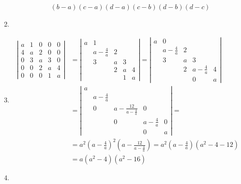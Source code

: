 \documentclass[twoside]{amsart}
\theoremstyle{plain}
\theoremstyle{definition}
\begin{document}
\begin{enumerate}
\[\begin{aligned}
    & \boxed{ (b-a)(c-a)(d-a)(c-b)(d-b) (d-c) }
  \end{aligned} \]
\item 
\item \[
  \begin{aligned}
\left| \begin{matrix} a & 1 & 0 & 0 & 0 \\ 4 & a & 2 & 0 & 0 \\ 0 & 3 & a & 3 & 0 \\ 0 & 0 & 2 & a & 4 \\ 0 & 0 & 0 & 1 & a \end{matrix} \right| & = \left| \begin{matrix} a & 1 & & & \\ & a-\frac{4}{a} & 2 & & \\ & 3 & a & 3 & \\ & & 2 & a & 4 \\ & & & 1 & a \end{matrix} \right| = \left|  \begin{matrix} a & 0 & & & \\ & a-\frac{4}{a} & 2 & & \\ & 3 & a & 3 & \\ & & 2 & a - \frac{4}{a} & 4 \\ & & & 0  & a \end{matrix} \right|  \\
& = \left|  \begin{matrix} a &  & & & \\ & a-\frac{4}{a} &  & & \\ & 0 & a-\frac{12}{a-\frac{4}{a}} & 0 & \\ & & 0 & a-\frac{4}{a} & 0 \\ & & & 0 & a \end{matrix} \right| = \\ 
& = a^2 (a-\frac{4}{a})^2 \left( a - \frac{12}{a-\frac{4}{a}} \right) = a^2 (a-\frac{4}{a})(a^2 -4 - 12 )  \\
& = a(a^2 - 4)(a^2 -16)
  \end{aligned}
\]
\item \[
  \begin{aligned}

\end{aligned}\]
\end{enumerate}
\end{document}
